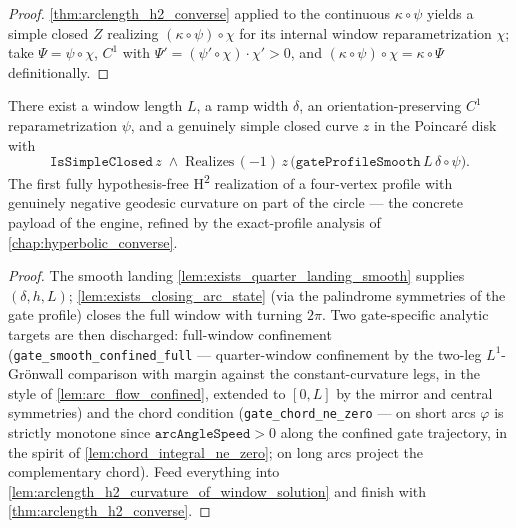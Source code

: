 \begin{proof}
  \leanok
  \cref{thm:arclength_h2_converse} applied to the continuous $\kappa\circ\psi$
  yields a simple closed $Z$ realizing $(\kappa\circ\psi)\circ\chi$ for its
  internal window reparametrization $\chi$; take $\Psi=\psi\circ\chi$, $C^1$
  with $\Psi'=(\psi'\circ\chi)\cdot\chi'>0$, and
  $(\kappa\circ\psi)\circ\chi=\kappa\circ\Psi$ definitionally.
\end{proof}

\begin{theorem}
  \label{thm:gate_profile_smooth_realization}
  There exist a window length $L$, a ramp width $\delta$, an
  orientation-preserving $C^1$ reparametrization $\psi$, and a genuinely simple
  closed curve $z$ in the Poincaré disk with
  \[
    \texttt{IsSimpleClosed}\,z \;\wedge\;
    \mathrm{Realizes}\,(-1)\,z\,
    \bigl(\texttt{gateProfileSmooth}\,L\,\delta\circ\psi\bigr).
  \]
  The first fully hypothesis-free H\textsuperscript{2} realization of a
  four-vertex profile with genuinely negative geodesic curvature on part of the
  circle — the concrete payload of the engine, refined by the exact-profile
  analysis of \cref{chap:hyperbolic_converse}.
\end{theorem}

\begin{proof}
  \leanok
  The smooth landing \cref{lem:exists_quarter_landing_smooth} supplies
  $(\delta,h,L)$; \cref{lem:exists_closing_arc_state} (via the palindrome
  symmetries of the gate profile) closes the full window with turning $2\pi$.
  Two gate-specific analytic targets are then discharged: full-window
  confinement (\texttt{gate\_smooth\_confined\_full} — quarter-window
  confinement by the two-leg $L^1$-Grönwall comparison with margin against the
  constant-curvature legs, in the style of \cref{lem:arc_flow_confined},
  extended to $[0,L]$ by the mirror and central symmetries) and the chord
  condition (\texttt{gate\_chord\_ne\_zero} — on short arcs $\varphi$ is
  strictly monotone since $\texttt{arcAngleSpeed}>0$ along the confined gate
  trajectory, in the spirit of \cref{lem:chord_integral_ne_zero}; on long arcs
  project the complementary chord). Feed everything into
  \cref{lem:arclength_h2_curvature_of_window_solution} and finish with
  \cref{thm:arclength_h2_converse}.
\end{proof}
